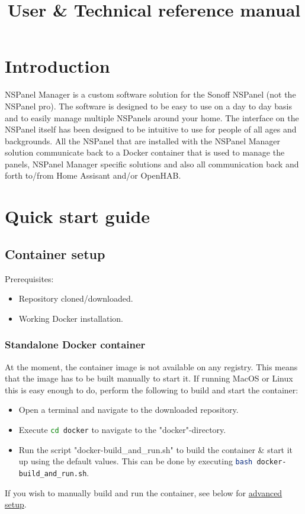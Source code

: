 \documentclass[10pt]{article}
\title{User \& Technical reference manual} %
\author{} %
\date{} %
\begin{document}
    \maketitle %

    \clearpage
    \tableofcontents
    \clearpage
    \section{Introduction} %
    NSPanel Manager is a custom software solution for the Sonoff NSPanel (not the NSPanel pro). The software is designed to be easy to use on a day to day basis and to easily manage multiple NSPanels around your home.
    The interface on the NSPanel itself has been designed to be intuitive to use for people of all ages and backgrounds.
    \bigbreak
    All the NSPanel that are installed with the NSPanel Manager solution communicate back to a Docker container that is used to manage the panels, NSPanel Manager specific solutions and also all communication back and forth to/from Home Assisant and/or OpenHAB.

    \clearpage
    \section{Quick start guide}
    \subsection{Container setup}
    Prerequisites:
    \begin{itemize}
      \item Repository cloned/downloaded.
      \item Working Docker installation.
    \end{itemize}
    \subsubsection{Standalone Docker container}
    At the moment, the container image is not available on any registry. This means that the image has to be built manually to start it. If running MacOS or Linux this is easy enough to do, perform the following to build and start the container:
    \begin{itemize}
      \item Open a terminal and navigate to the downloaded repository.
      \item Execute \lstinline[language=bash]|cd docker| to navigate to the "docker"-directory.
      \item Run the script "docker-build\_and\_run.sh" to build the container \& start it up using the default values. This can be done by executing \lstinline[language=bash]|bash docker-build_and_run.sh|.
    \end{itemize}
    If you wish to manually build and run the container, see below for \hyperref[sec:advanced_setup]{advanced setup}.
\end{document}
